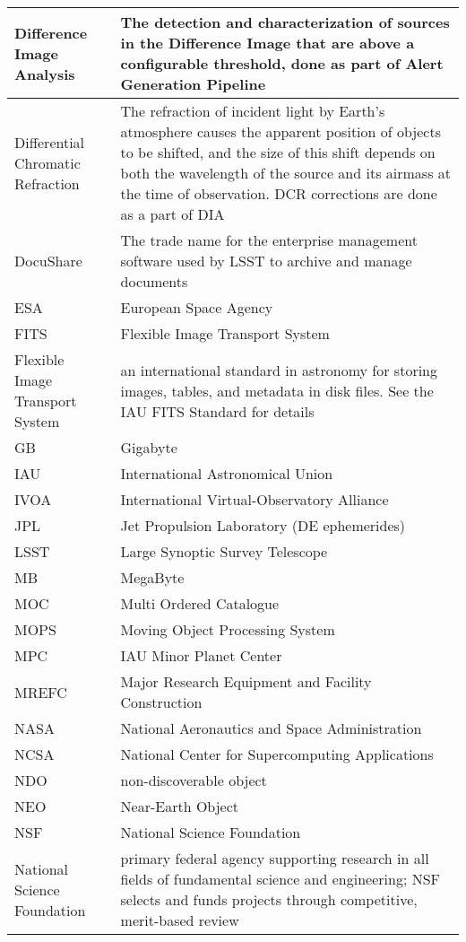 \begin{longtable}{|p{}|p{}|}
Difference Image Analysis & The detection and characterization of sources in the \gls{Difference Image} that are above a configurable threshold, done as part of \gls{Alert} Generation Pipeline \\\hline
Differential Chromatic Refraction & The refraction of incident light by Earth's atmosphere causes the apparent position of objects to be shifted, and the size of this shift depends on both the wavelength of the source and its \gls{airmass} at the time of observation. \gls{DCR} corrections are done as a part of \gls{DIA} \\\hline
DocuShare & The trade name for the enterprise management software used by \gls{LSST} to archive and manage documents \\\hline
ESA & European Space Agency \\\hline
FITS & \gls{Flexible Image Transport System} \\\hline
Flexible Image Transport System & an international standard in astronomy for storing images, tables, and \gls{metadata} in disk files. See the \gls{IAU} \gls{FITS} Standard for details \\\hline
GB & Gigabyte \\\hline
IAU & International Astronomical Union \\\hline
IVOA & International Virtual-Observatory Alliance \\\hline
JPL & Jet Propulsion Laboratory (DE ephemerides) \\\hline
LSST & Large Synoptic Survey Telescope \\\hline
MB & MegaByte \\\hline
MOC & Multi Ordered Catalogue \\\hline
MOPS & \gls{Moving Object Processing System} \\\hline
MPC & \gls{IAU} Minor Planet \gls{Center} \\\hline
MREFC & Major Research Equipment and Facility \gls{Construction} \\\hline
NASA & National Aeronautics and Space Administration \\\hline
NCSA & National \gls{Center} for Supercomputing Applications \\\hline
NDO & non-discoverable object \\\hline
NEO & Near-Earth \gls{Object} \\\hline
NSF & \gls{National Science Foundation} \\\hline
National Science Foundation & primary federal agency supporting research in all fields of fundamental science and engineering; \gls{NSF} selects and funds projects through competitive, merit-based review \\\hline

\end{longtable}
